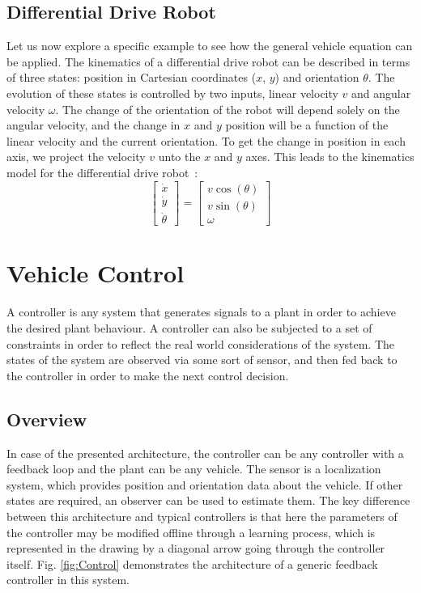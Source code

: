 \documentclass[conference]{IEEEtran}
\begin{document}
\subsection{Differential Drive Robot}
Let us now explore a specific example to see how the general vehicle equation can be applied. The kinematics of a differential drive robot can be described in terms of three states: position in Cartesian coordinates ($x$, $y$) and orientation $\theta$. The evolution of these states is controlled by two inputs, linear velocity $v$ and angular velocity $\omega$. The change of the orientation of the robot will depend solely on the angular velocity, and the change in $x$ and $y$ position will be a function of the linear velocity and the current orientation. To get the change in position in each axis, we project the velocity $v$ unto the $x$ and $y$ axes. This leads to the kinematics model for the differential drive robot~\cite{Siegwart:2004}:
$$
\begin{bmatrix}
\dot{x} \\
\dot{y} \\
\dot{\theta}
\end{bmatrix}
=
\begin{bmatrix}
v\cos(\theta) \\
v\sin(\theta) \\
\omega
\end{bmatrix}
$$

\section{Vehicle Control} \label{sec:MPCForm}

A controller is any system that generates signals to a plant in order to achieve the desired plant behaviour. A controller can also be subjected to a set of constraints in order to reflect the real world considerations of the system. The states of the system are observed via some sort of sensor, and then fed back to the controller in order to make the next control decision. 

\subsection{Overview}
In case of the presented architecture, the controller can be any controller with a feedback loop and the plant can be any vehicle. The sensor is a localization system, which provides position and orientation data about the vehicle. If other states are required, an observer can be used to estimate them. The key difference between this architecture and typical controllers is that here the parameters of the controller may be modified offline through a learning process, which is represented in the drawing by a diagonal arrow going through the controller itself. Fig. \ref{fig:Control} demonstrates the architecture of a generic feedback controller in this system.
\end{document}
